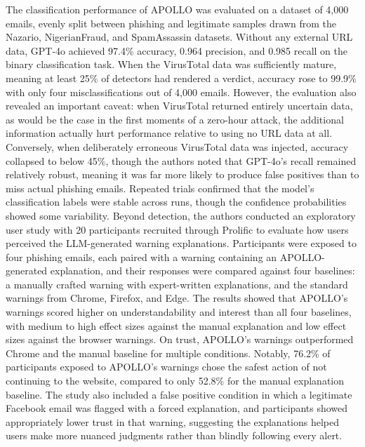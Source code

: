 \documentclass[conference]{IEEEtran}
\begin{document}
The classification performance of APOLLO was evaluated on a dataset of 4,000 emails, evenly split between phishing and legitimate samples drawn from the Nazario, NigerianFraud, and SpamAssassin datasets\cite{desolda_apollo_2025}. Without any external URL data, GPT-4o achieved 97.4\% accuracy, 0.964 precision, and 0.985 recall on the binary classification task. When the VirusTotal data was sufficiently mature, meaning at least 25\% of detectors had rendered a verdict, accuracy rose to 99.9\% with only four misclassifications out of 4,000 emails\cite{desolda_apollo_2025}. However, the evaluation also revealed an important caveat: when VirusTotal returned entirely uncertain data, as would be the case in the first moments of a zero-hour attack, the additional information actually hurt performance relative to using no URL data at all. Conversely, when deliberately erroneous VirusTotal data was injected, accuracy collapsed to below 45\%, though the authors noted that GPT-4o's recall remained relatively robust, meaning it was far more likely to produce false positives than to miss actual phishing emails\cite{desolda_apollo_2025}. Repeated trials confirmed that the model's classification labels were stable across runs, though the confidence probabilities showed some variability.
Beyond detection, the authors conducted an exploratory user study with 20 participants recruited through Prolific to evaluate how users perceived the LLM-generated warning explanations. Participants were exposed to four phishing emails, each paired with a warning containing an APOLLO-generated explanation, and their responses were compared against four baselines: a manually crafted warning with expert-written explanations, and the standard warnings from Chrome, Firefox, and Edge\cite{desolda_apollo_2025}. The results showed that APOLLO's warnings scored higher on understandability and interest than all four baselines, with medium to high effect sizes against the manual explanation and low effect sizes against the browser warnings. On trust, APOLLO's warnings outperformed Chrome and the manual baseline for multiple conditions. Notably, 76.2\% of participants exposed to APOLLO's warnings chose the safest action of not continuing to the website, compared to only 52.8\% for the manual explanation baseline\cite{desolda_apollo_2025}. The study also included a false positive condition in which a legitimate Facebook email was flagged with a forced explanation, and participants showed appropriately lower trust in that warning, suggesting the explanations helped users make more nuanced judgments rather than blindly following every alert\cite{desolda_apollo_2025}.
\end{document}
